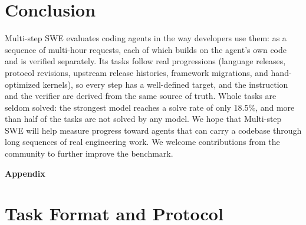\documentclass{article}
\newcommand{\bench}{Multi-step SWE\xspace}
\begin{document}
\section{Conclusion}
\label{sec:conclusion}

\bench evaluates coding agents in the way developers use them: as a sequence of
multi-hour requests, each of which builds on the agent's own code and is
verified separately. Its tasks follow real progressions (language releases,
protocol revisions, upstream release histories, framework migrations, and
hand-optimized kernels), so every step has a well-defined target, and the
instruction and the verifier are derived from the same source of truth. Whole
tasks are seldom solved: the strongest model reaches a solve rate of only
18.5\%, and
more than half of the tasks are not solved by any model. We hope that \bench
will help measure progress toward agents that can carry a codebase through long
sequences of real engineering work. We welcome contributions from the
community to further improve the benchmark.






\clearpage
\appendix
{\centering\LARGE\bfseries Appendix\par}
\vspace{1.2em}

\section{Task Format and Protocol}
\label{sec:protocol}
\end{document}
